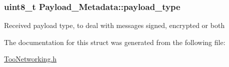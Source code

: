 \subsubsection[{\texorpdfstring{payload\+\_\+type}{payload_type}}]{\setlength{\rightskip}{0pt plus 5cm}uint8\+\_\+t Payload\+\_\+\+Metadata\+::payload\+\_\+type}\hypertarget{structPayload__Metadata_a5009210cc0592eda44bd9fd05b17d2a8}{}\label{structPayload__Metadata_a5009210cc0592eda44bd9fd05b17d2a8}
Received payload type, to deal with messages signed, encrypted or both 

The documentation for this struct was generated from the following file\+:\begin{DoxyCompactItemize}
\item 
\hyperlink{TooNetworking_8h}{Too\+Networking.\+h}\end{DoxyCompactItemize}
